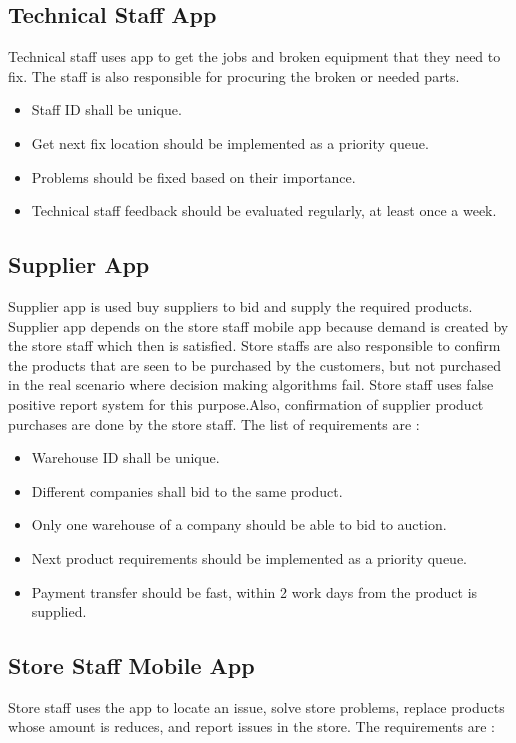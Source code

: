 \subsection{Technical Staff App}
Technical staff uses app to get the jobs and broken equipment that they need to fix. The staff is also responsible for procuring the broken or needed parts.

\begin{itemize}
    \item Staff ID shall be unique.
    \item Get next fix location should be implemented as a priority queue.
    \item Problems should be fixed based on their importance.
    \item Technical staff feedback should be evaluated regularly, at least once a week.
\end{itemize}


\subsection{Supplier App}
Supplier app is used buy suppliers to bid and supply the required products. Supplier app depends on the store staff mobile app because demand is created by the store staff which then is satisfied. Store staffs are also responsible to confirm the products that are seen to be purchased by the customers, but not purchased in the real scenario where decision making algorithms fail. Store staff uses false positive report system for this purpose.Also, confirmation of supplier product purchases are done by the store staff. The list of requirements are :

\begin{itemize}
    \item Warehouse ID shall be unique.
    \item Different companies shall bid to the same product.
    \item Only one warehouse of a company should be able to bid to auction.
    \item Next product requirements should be implemented as a priority queue.
    \item Payment transfer should be fast, within 2 work days from the product is supplied.
\end{itemize}


\subsection{Store Staff Mobile App}
Store staff uses the app to locate an issue, solve store problems, replace products whose amount is reduces, and report issues in the store. The requirements are :


